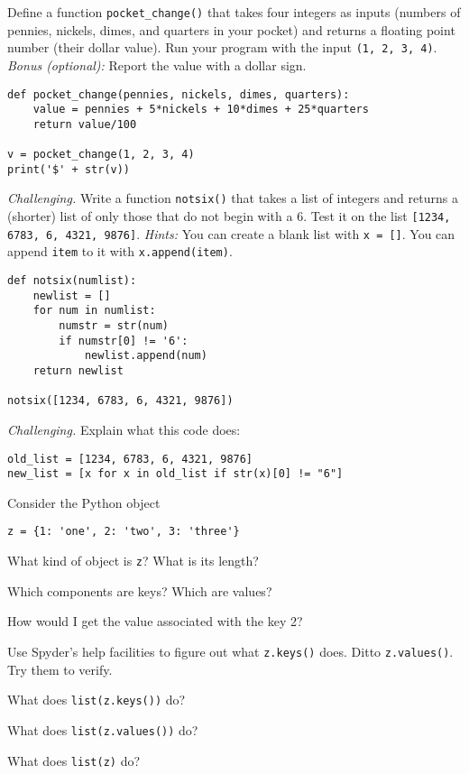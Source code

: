 \documentclass[11pt]{exam}
\begin{document}
\begin{questions}
\item Define a function \verb|pocket_change()| that takes four integers as inputs
(numbers of pennies, nickels, dimes, and quarters in your pocket)
and returns a floating point number (their dollar value).
Run your program with the input {\tt (1, 2, 3, 4)}.
{\it Bonus (optional):} Report the value with a dollar sign.

\begin{solution}
\begin{verbatim}
def pocket_change(pennies, nickels, dimes, quarters):
    value = pennies + 5*nickels + 10*dimes + 25*quarters
    return value/100

v = pocket_change(1, 2, 3, 4)
print('$' + str(v))
\end{verbatim}
\end{solution}


\item {\it Challenging.\/}
Write a function {\tt notsix()} that takes a list of integers
and returns a (shorter) list of only those that do not begin with a 6.
Test it on the list {\tt [1234, 6783, 6, 4321, 9876]}.
{\it Hints:}  You can create a blank list with {\tt x = []}.
You can append  {\tt item} to it with {\tt x.append(item)}.

\begin{solution}
\begin{verbatim}
def notsix(numlist):
    newlist = []
    for num in numlist:
        numstr = str(num)
        if numstr[0] != '6':
            newlist.append(num)
    return newlist

notsix([1234, 6783, 6, 4321, 9876])
\end{verbatim}
\end{solution}


\item {\it Challenging.\/}
 Explain what this code does:
\begin{verbatim}
old_list = [1234, 6783, 6, 4321, 9876]
new_list = [x for x in old_list if str(x)[0] != "6"]
\end{verbatim}

\item Consider the Python object
\begin{verbatim}
z = {1: 'one', 2: 'two', 3: 'three'}
\end{verbatim}
\begin{parts}
\item What kind of object is {\tt z}?  What is its length?
\item Which components are keys?  Which are values?
\item How would I get the value associated with the key 2?
\item Use Spyder's help facilities to figure out what {\tt z.keys()} does.
Ditto {\tt z.values()}.  Try them to verify.
\item What does {\tt list(z.keys())} do?
\item What does {\tt list(z.values())} do?
\item What does {\tt list(z)} do?
\end{parts}


\end{questions}
\end{document}
